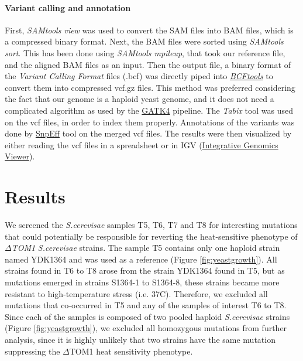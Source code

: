 \documentclass[10pt,a4paper]{article}
\begin{document}
\paragraph{Variant calling and annotation}
First, \textit{SAMtools view}\cite{li_sequence_2009} was used to convert the SAM files into BAM files, which is a compressed binary format. Next, the BAM files were sorted using \textit{SAMtools sort}. This has been done using \textit{SAMtools mpileup}, that took our reference file, and the aligned BAM files as an input. Then the output file, a binary format of the \textit{Variant Calling Format} files (.bcf) was directly piped into \href{www.http://www.htslib.org/}{\textit{BCFtools}} to convert them into compressed vcf.gz files. This method was preferred considering the fact that our genome is a haploid yeast genome, and it does not need a complicated algorithm as used by the \href{https://software.broadinstitute.org/gatk/}{GATK4} pipeline. The \textit{Tabix}\cite{li_tabix:_2011} tool was used on the vcf files, in order to index them properly. Annotations of the variants was done by \href{http://snpeff.sourceforge.net/}{SnpEff} tool on the merged vcf files. The results were then visualized by either reading the vcf files in a spreadsheet or in IGV (\href{http://software.broadinstitute.org/software/igv/}{Integrative Genomics Viewer}).\\



\section*{\large Results}
We screened the \textit{S.cerevisae} samples T5, T6, T7 and T8 for interesting mutations that could potentially be responsible for reverting the heat-sensitive phenotype of \textit{$\Delta$TOM1} \textit{S.cerevisae} strains. The sample T5 contains only one haploid strain named YDK1364 and was used as a reference (Figure \ref{fig:yeastgrowth}). All strains found in T6 to T8 arose from the strain YDK1364 found in T5, but as mutations emerged in strains S1364-1 to S1364-8, these strains became more resistant to high-temperature stress (i.e. 37\degree C). Therefore, we excluded all mutations that co-occurred in T5 and any of the samples of interest T6 to T8. Since each of the samples is composed of two pooled haploid \textit{S.cerevisae} strains (Figure \ref{fig:yeastgrowth}), we excluded all homozygous mutations from further analysis, since it is highly unlikely that two strains have the same mutation suppressing the $\Delta$TOM1 heat sensitivity phenotype.
\end{document}
